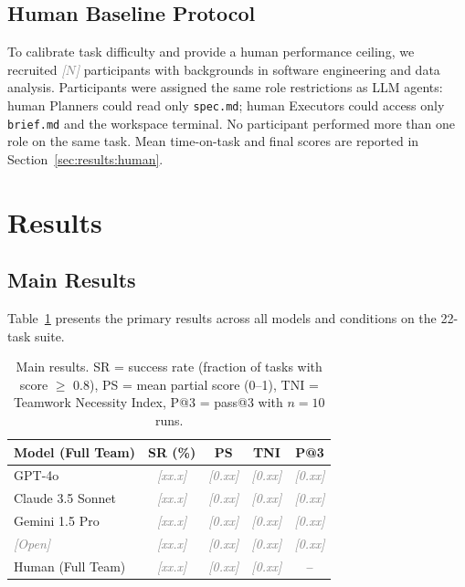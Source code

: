 \documentclass{article}
\newcommand{\tni}{\textsc{TNI}}
\newcommand{\placeholder}[1]{\textcolor{gray}{\textit{[#1]}}}
\newcommand{\sys}[1]{\texttt{#1}}
\begin{document}
\subsection{Human Baseline Protocol}
\label{sec:setup:human}

To calibrate task difficulty and provide a human performance ceiling, we
recruited \placeholder{$N$} participants with backgrounds in software
engineering and data analysis. Participants were assigned the same role
restrictions as LLM agents: human Planners could read only \sys{spec.md};
human Executors could access only \sys{brief.md} and the workspace terminal.
No participant performed more than one role on the same task. Mean
time-on-task and final scores are reported in Section~\ref{sec:results:human}.

\section{Results}
\label{sec:results}

\subsection{Main Results}
\label{sec:results:main}

Table~\ref{tab:main} presents the primary results across all models and
conditions on the 22-task suite.

\begin{table}[h]
\centering
\caption{Main results. SR = success rate (fraction of tasks with score $\geq$
  0.8), PS = mean partial score (0--1), \tni{} = Teamwork Necessity Index,
  P@3 = pass@3 with $n=10$ runs.}
\label{tab:main}
\small
\begin{tabular}{lcccc}
\toprule
\textbf{Model (Full Team)} & \textbf{SR (\%)} & \textbf{PS} & \textbf{\tni} & \textbf{P@3} \\
\midrule
GPT-4o              & \placeholder{xx.x} & \placeholder{0.xx} & \placeholder{0.xx} & \placeholder{0.xx} \\
Claude 3.5 Sonnet   & \placeholder{xx.x} & \placeholder{0.xx} & \placeholder{0.xx} & \placeholder{0.xx} \\
Gemini 1.5 Pro      & \placeholder{xx.x} & \placeholder{0.xx} & \placeholder{0.xx} & \placeholder{0.xx} \\
\placeholder{Open}  & \placeholder{xx.x} & \placeholder{0.xx} & \placeholder{0.xx} & \placeholder{0.xx} \\
\midrule
Human (Full Team)   & \placeholder{xx.x} & \placeholder{0.xx} & \placeholder{0.xx} & -- \\
\bottomrule
\end{tabular}
\end{table}
\end{document}
